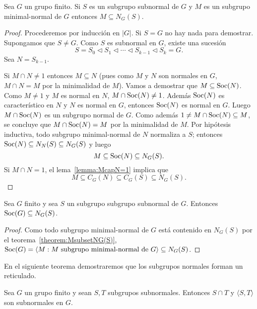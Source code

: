 \begin{theorem}[Wielandt]
	\label{theorem:MsubsetNG(S)}
	Sea $G$ un grupo finito. Si $S$ es un subgrupo subnormal de $G$ 
	y $M$ es un subgrupo minimal-normal de $G$ entonces $M\subseteq N_G(S)$.
\end{theorem}

\begin{proof}
	Procederemos por inducción en $|G|$. Si $S=G$ no hay nada para demostrar.
	Supongamos que $S\ne G$.  Como $S$ es subnormal en $G$, existe una sucesión 
	\[
		S=S_0\triangleleft S_1\triangleleft\cdots\triangleleft S_{k-1}\triangleleft S_k=G.
	\]
	Sea $N=S_{k-1}$. 

	Si $M\cap N\ne 1$ entonces $M\subseteq N$ (pues como $M$ y $N$ son normales
	en $G$, $M\cap N=M$ por la minimalidad de $M$). Vamos a demostrar que
	$M\subseteq\operatorname{Soc}(N)$.  Como $M\ne 1$ y $M$ es normal en $N$,
	$M\cap\operatorname{Soc}(N)\ne 1$. Además $\operatorname{Soc}(N)$ es característico en $N$ y $N$ es
	normal en $G$, entonces $\operatorname{Soc}(N)$ es normal en $G$. Luego $M\cap\operatorname{Soc}(N)$ es
	un subgrupo normal de $G$. Como además $1\ne M\cap\operatorname{Soc}(N)\subseteq M$, se
	concluye que $M\cap\operatorname{Soc}(N)=M$ por la minimalidad de $M$. Por hipótesis inductiva, 
	todo subgrupo minimal-normal de $N$ normaliza a $S$; entonces 
	$\operatorname{Soc}(N)\subseteq N_N(S)\subseteq N_G(S)$ y luego 
	\[
	M\subseteq\operatorname{Soc}(N)\subseteq N_G(S).
	\]
	Si $M\cap N=1$, el lema~\ref{lemma:McapN=1} implica que
	\[
	M\subseteq C_G(N)\subseteq C_G(S)\subseteq N_G(S). 
	\]
\end{proof}

\begin{corollary}
	Sea $G$ finito y sea $S$ un subgrupo subgrupo subnormal de $G$. Entonces
	$\operatorname{Soc}(G)\subseteq N_G(S)$.
\end{corollary}

\begin{proof}
	Como todo subgrupo minimal-normal de $G$ está contenido en $N_G(S)$ por 
	el teorema~\ref{theorem:MsubsetNG(S)}, 
	$\operatorname{Soc}(G)=\langle M:M\text{ subgrupo 
	minimal-normal de $G$}\rangle\subseteq N_G(S)$.
\end{proof}

En el siguiente teorema demostraremos que los subgrupos normales forman un
reticulado.

\begin{theorem}[Wielandt]
	\label{theorem:STsubnormal}
	Sea $G$ un grupo finito y sean $S,T$ subgrupos subnormales. Entonces $S\cap T$ y 
	$\langle S,T\rangle$ son subnormales en $G$.
\end{theorem}

